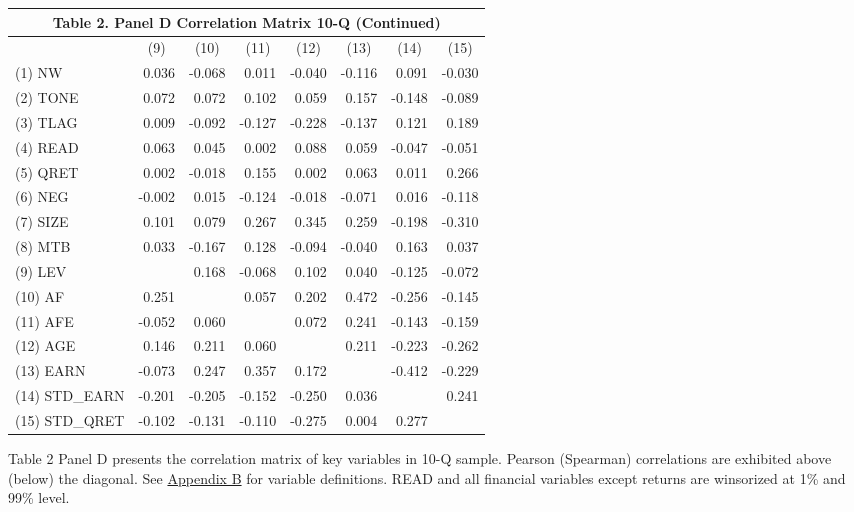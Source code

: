 \begin{table}[H]
  \begin{center}
  	\begin{tabular}{lrrrrrrr}
  		\multicolumn{8}{c}{\textbf{Table 2. Panel D Correlation Matrix 10-Q (Continued) }} \\
  		\midrule
  		\midrule
  		& \multicolumn{1}{c}{(9)} & \multicolumn{1}{c}{(10)} & \multicolumn{1}{c}{(11)} & \multicolumn{1}{c}{(12)} & \multicolumn{1}{c}{(13)} & \multicolumn{1}{c}{(14)} & \multicolumn{1}{c}{(15)} \\
  		\midrule
  		(1) NW & 0.036 & -0.068 & 0.011 & -0.040 & -0.116 & 0.091 & -0.030 \\
  		(2) TONE & 0.072 & 0.072 & 0.102 & 0.059 & 0.157 & -0.148 & -0.089 \\
  		(3) TLAG & 0.009 & -0.092 & -0.127 & -0.228 & -0.137 & 0.121 & 0.189 \\
  		(4) READ & 0.063 & 0.045 & 0.002 & 0.088 & 0.059 & -0.047 & -0.051 \\
  		(5) QRET & 0.002 & -0.018 & 0.155 & 0.002 & 0.063 & 0.011 & 0.266 \\
  		(6) NEG & -0.002 & 0.015 & -0.124 & -0.018 & -0.071 & 0.016 & -0.118 \\
  		(7) SIZE & 0.101 & 0.079 & 0.267 & 0.345 & 0.259 & -0.198 & -0.310 \\
  		(8) MTB & 0.033 & -0.167 & 0.128 & -0.094 & -0.040 & 0.163 & 0.037 \\
  		(9) LEV &  & 0.168 & -0.068 & 0.102 & 0.040 & -0.125 & -0.072 \\
  		(10) AF & 0.251 &  & 0.057 & 0.202 & 0.472 & -0.256 & -0.145 \\
  		(11) AFE & -0.052 & 0.060 &  & 0.072 & 0.241 & -0.143 & -0.159 \\
  		(12) AGE & 0.146 & 0.211 & 0.060 &  & 0.211 & -0.223 & -0.262 \\
  		(13) EARN & -0.073 & 0.247 & 0.357 & 0.172 &  & -0.412 & -0.229 \\
  		(14) STD\_EARN & -0.201 & -0.205 & -0.152 & -0.250 & 0.036 &  & 0.241 \\
  		(15) STD\_QRET & -0.102 & -0.131 & -0.110 & -0.275 & 0.004 & 0.277 & \\
  		\bottomrule
  		\bottomrule
  	\end{tabular}%
  \end{center}
	\begin{footnotesize}
		\noindent Table 2 Panel D presents the correlation matrix of key variables in 10-Q sample. Pearson (Spearman) correlations are exhibited above (below) the diagonal. See \hyperref[appb]{Appendix B} for variable definitions. READ and all financial variables except returns are winsorized at 1\% and 99\% level. 
	\end{footnotesize}
\end{table}%